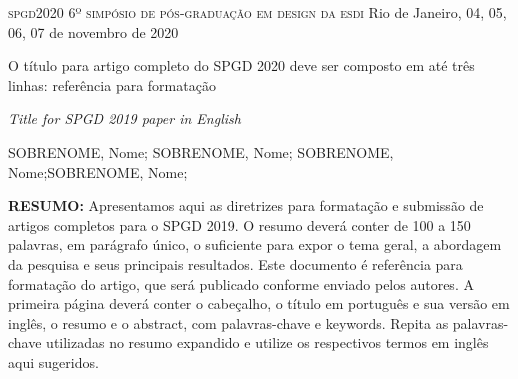 \documentclass[a4paper,11pt,oneside,onecolumn,final]{article}
\begin{document}
\setlength{\parindent}{0pt} %


\begin{titlepage}

\textsc{spgd2020} \hfill \break
\textsc{6º simpósio de pós-graduação em design da esdi} \hfill \break
 Rio de Janeiro, 04, 05, 06, 07 de novembro de 2020

\vspace{10mm} %

\Huge O título para artigo completo do SPGD 2020 deve ser composto em até três linhas: referência para formatação

\vspace{5mm} %


\huge \textit{Title for SPGD 2019 paper in English}

\vspace{10mm} %

\normalsize
SOBRENOME, Nome; SOBRENOME, Nome; SOBRENOME, Nome;SOBRENOME, Nome;

\vspace{5mm} %



\textbf{RESUMO:} Apresentamos aqui as diretrizes para formatação e submissão de artigos completos para o SPGD 2019. O resumo deverá conter de 100 a 150 palavras, em parágrafo único, o suficiente para expor o tema geral, a abordagem da pesquisa e seus principais resultados. Este documento é referência para formatação do artigo, que será publicado conforme enviado pelos autores. A primeira página deverá conter o cabeçalho, o título em português e sua versão em inglês, o resumo e o abstract, com palavras-chave e keywords. Repita as palavras-chave utilizadas no resumo expandido e utilize os respectivos termos em inglês aqui sugeridos.

\vspace{5mm} %


\end{titlepage}
\end{document}

